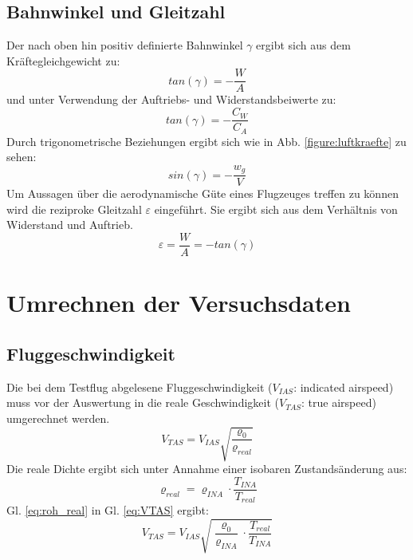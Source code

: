 \subsection{Bahnwinkel und Gleitzahl}
Der nach oben hin positiv definierte Bahnwinkel $\gamma$ ergibt sich aus dem Kräftegleichgewicht zu:
\begin{equation}
tan(\gamma)=-\frac{W}{A}
\end{equation}
und unter Verwendung der Auftriebs- und Widerstandsbeiwerte zu:
\begin{equation}
tan(\gamma)=-\frac{C_W}{C_A}
\end{equation}
Durch trigonometrische Beziehungen ergibt sich wie in Abb. \ref{figure:luftkraefte} zu sehen:
\begin{equation}
\label{eq:bahnneigungswinkel}
sin(\gamma) = -\frac{w_g}{V}
\end{equation}
%
%
%
%
Um Aussagen über die aerodynamische Güte eines Flugzeuges treffen zu können wird die reziproke Gleitzahl $\varepsilon$ eingeführt. Sie ergibt sich aus dem Verhältnis von Widerstand und Auftrieb.
\begin{equation}
\varepsilon=\frac{W}{A}=-tan(\gamma)
\end{equation}
%

\section{Umrechnen der Versuchsdaten}
\subsection{Fluggeschwindigkeit}
Die bei dem Testflug abgelesene Fluggeschwindigkeit ($V_{IAS}$: indicated airspeed) muss vor der Auswertung in die reale Geschwindigkeit ($V_{TAS}$: true airspeed) umgerechnet werden.
\begin{equation} \label{eq:VTAS}
V_{TAS}=V_{IAS} \sqrt{\frac{\varrho_0}{\varrho_{real}}}
\end{equation} 
Die reale Dichte ergibt sich unter Annahme einer isobaren Zustandsänderung aus:
\begin{equation} \label{eq:roh_real}
\varrho_{real} = \varrho_{INA}  \cdot  \frac{T_{INA}}{T_{real}}
\end{equation}
Gl. \ref{eq:roh_real} in Gl. \ref{eq:VTAS} ergibt:
\begin{equation}
V_{TAS}=V_{IAS} \sqrt{\frac{\varrho_0}{\varrho_{INA}} \cdot \frac{T_{real}}{T_{INA}}}
\end{equation}
%
